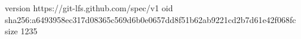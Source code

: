version https://git-lfs.github.com/spec/v1
oid sha256:a6493958ec317d08365c569d6b0e0657dd8f51b62ab9221cd2b7d61e42f068fc
size 1235
